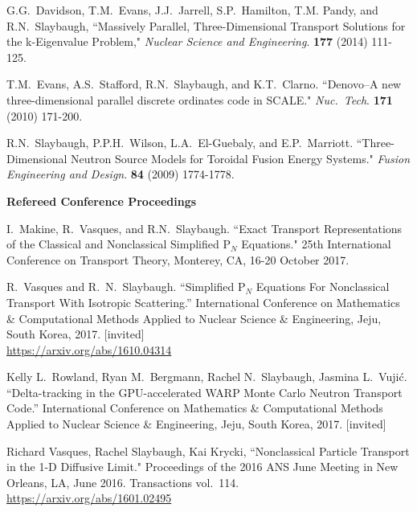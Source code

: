 \begin{bibsection}
\item G.G.\ Davidson, T.M.\ Evans, J.J.\ Jarrell, S.P.\ Hamilton, T.M. Pandy, and R.N.\ Slaybaugh, ``Massively Parallel, Three-Dimensional Transport Solutions for the k-Eigenvalue Problem," \textit{Nuclear Science and Engineering}. \textbf{177} (2014) 111-125.

\item T.M.\ Evans, A.S.\ Stafford, R.N.\ Slaybaugh, and K.T.\ Clarno. ``Denovo--A new three-dimensional parallel discrete ordinates code in SCALE." \textit{Nuc.\ Tech}. \textbf{171} (2010) 171-200.

\item R.N.\ Slaybaugh, P.P.H.\ Wilson, L.A.\ El-Guebaly, and E.P.\ Marriott. ``Three-Dimensional Neutron Source Models for Toroidal Fusion Energy Systems." \textit{Fusion Engineering and Design}. \textbf{84} (2009) 1774-1778. 

\item \textbf{Refereed Conference Proceedings}
\item  I.\ Makine, R.\ Vasques, and R.N.\ Slaybaugh. ``Exact Transport Representations of the Classical and Nonclassical Simplified P$_N$ Equations." 25th International Conference on Transport Theory, Monterey, CA, 16-20 October 2017.

\item R.\ Vasques and R.\ N.\ Slaybaugh. ``Simplified P$_N$ Equations For Nonclassical Transport With Isotropic Scattering.'' International Conference on Mathematics \& Computational Methods Applied to Nuclear Science \& Engineering, Jeju, South Korea, 2017. [invited]\\
\url{https://arxiv.org/abs/1610.04314}

\item Kelly L.\ Rowland, Ryan M.\ Bergmann, Rachel N.\ Slaybaugh, Jasmina L.\ Vuji\'c. ``Delta-tracking in the GPU-accelerated WARP Monte Carlo Neutron Transport Code.'' International Conference on Mathematics \& Computational Methods Applied to Nuclear Science \& Engineering, Jeju, South Korea, 2017. [invited]


\item Richard Vasques, Rachel Slaybaugh, Kai Krycki, ``Nonclassical Particle Transport in the 1-D Diffusive Limit." Proceedings of the 2016 ANS June Meeting in New Orleans, LA, June 2016. Transactions vol.\ 114.\\
\url{https://arxiv.org/abs/1601.02495}


\end{bibsection}
